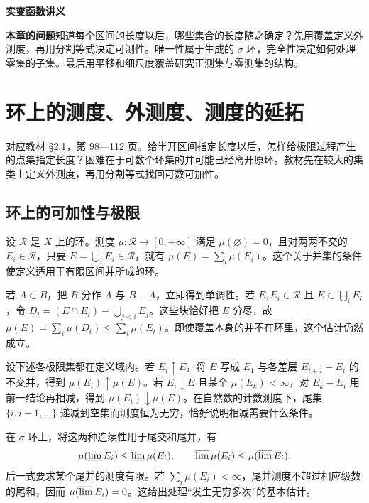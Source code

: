 \documentclass[11pt,a4paper]{article}
\begin{document}
\begin{center}
{\LARGE\bfseries 实变函数讲义\par}
\vspace{8pt}{\large 第二章\quad 测度理论\par}
\vspace{6pt}{\small 依徐森林、薛春华《实变函数论》\quad 教材第 98—173 页\par}
\end{center}
\vspace{8pt}
\noindent\textbf{本章的问题}\quad 知道每个区间的长度以后，哪些集合的长度随之确定？先用覆盖定义外测度，再用分割等式决定可测性。唯一性属于生成的 $\sigma$ 环，完全性决定如何处理零集的子集。最后用平移和细尺度覆盖研究正测集与零测集的结构。
\tableofcontents
\section{环上的测度、外测度、测度的延拓}
对应教材 \S{}2.1，第 98---112 页。给半开区间指定长度以后，怎样给极限过程产生的点集指定长度？困难在于可数个环集的并可能已经离开原环。教材先在较大的集类上定义外测度，再用分割等式找回可数可加性。

\subsection*{环上的可加性与极限}\label{ux73afux4e0aux7684ux53efux52a0ux6027ux4e0eux6781ux9650}

设 \(\mathcal R\) 是 \(X\) 上的环。测度 \(\mu:\mathcal R\to[0,+\infty]\) 满足 \(\mu(\varnothing)=0\)，且对两两不交的 \(E_i\in\mathcal R\)，只要 \(E=\bigcup_i E_i\in\mathcal R\)，就有 \(\mu(E)=\sum_i\mu(E_i)\)。这个关于并集的条件使定义适用于有限区间并所成的环。

若 \(A\subset B\)，把 \(B\) 分作 \(A\) 与 \(B-A\)，立即得到单调性。若 \(E,E_i\in\mathcal R\) 且 \(E\subset\bigcup_i E_i\)，令 \(D_i=(E\cap E_i)-\bigcup_{j<i}E_j\)。这些块恰好把 \(E\) 分尽，故 \(\mu(E)=\sum_i\mu(D_i)\leq\sum_i\mu(E_i)\)。即使覆盖本身的并不在环里，这个估计仍然成立。

设下述各极限集都在定义域内。若 \(E_i\uparrow E\)，将 \(E\) 写成 \(E_1\) 与各差层 \(E_{i+1}-E_i\) 的不交并，得到 \(\mu(E_i)\uparrow\mu(E)\)。若 \(E_i\downarrow E\) 且某个 \(\mu(E_k)<\infty\)，对 \(E_k-E_i\) 用前一结论再相减，得到 \(\mu(E_i)\downarrow\mu(E)\)。在自然数的计数测度下，尾集 \(\{i,i+1,\ldots\}\) 递减到空集而测度恒为无穷，恰好说明相减需要什么条件。

在 \(\sigma\) 环上，将这两种连续性用于尾交和尾并，有 \[
\mu(\varliminf E_i)\leq\varliminf\mu(E_i),\qquad
\varlimsup\mu(E_i)\leq\mu(\varlimsup E_i).
\] 后一式要求某个尾并的测度有限。若 \(\sum_i\mu(E_i)<\infty\)，尾并测度不超过相应级数的尾和，因而 \(\mu(\varlimsup E_i)=0\)。这给出处理``发生无穷多次''的基本估计。
\end{document}
